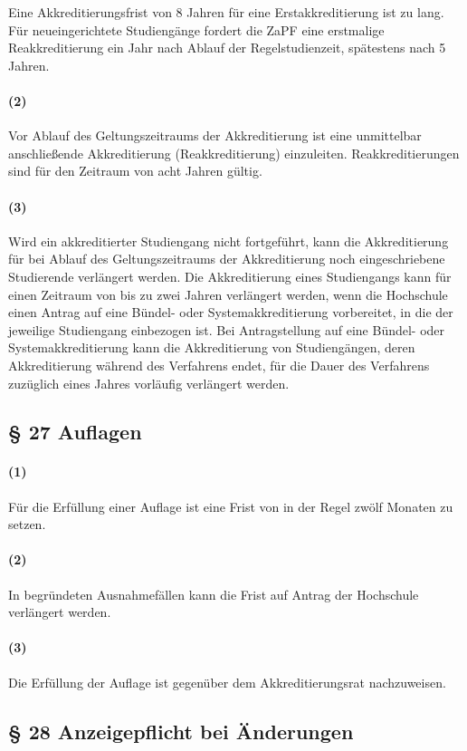 \documentclass[a4paper]{scrartcl}
\begin{document}
\textcolor{Bernd}{\textbf{\cite{RESO: SoSe2018-RV}}
Eine Akkreditierungsfrist von 8 Jahren für eine Erstakkreditierung ist zu lang. Für neueingerichtete Studiengänge fordert die ZaPF eine erstmalige Reakkreditierung ein Jahr nach Ablauf der Regelstudienzeit, spätestens nach 5 Jahren.}

\paragraph{(2)} Vor Ablauf des Geltungszeitraums der Akkreditierung ist eine unmittelbar anschließende Akkreditierung (Reakkreditierung) einzuleiten. Reakkreditierungen sind für den Zeitraum von acht Jahren gültig.
\paragraph{(3)} Wird ein akkreditierter Studiengang nicht fortgeführt, kann die Akkreditierung für bei Ablauf des Geltungszeitraums der Akkreditierung noch eingeschriebene Studierende verlängert werden. Die Akkreditierung eines Studiengangs kann für einen Zeitraum von bis zu zwei Jahren verlängert werden, wenn die Hochschule einen Antrag auf eine Bündel- oder Systemakkreditierung vorbereitet, in die der jeweilige Studiengang einbezogen ist. Bei Antragstellung auf eine Bündel- oder Systemakkreditierung kann die Akkreditierung von Studiengängen, deren Akkreditierung während des Verfahrens endet, für die Dauer des Verfahrens zuzüglich eines Jahres vorläufig verlängert werden.
\subsection{§ 27 Auflagen}
\paragraph{(1)} Für die Erfüllung einer Auflage ist eine Frist von in der Regel zwölf Monaten zu setzen.
\paragraph{(2)} In begründeten Ausnahmefällen kann die Frist auf Antrag der Hochschule verlängert werden.
\paragraph{(3)} Die Erfüllung der Auflage ist gegenüber dem Akkreditierungsrat nachzuweisen.
\subsection{§ 28 Anzeigepflicht bei Änderungen}
\end{document}
